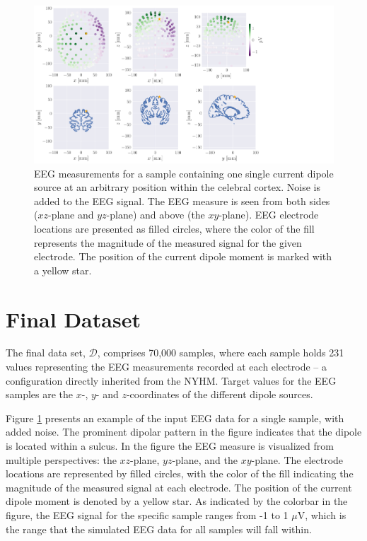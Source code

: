 \documentclass[a4paper, UKenglish, 11pt]{uiomaster}
\begin{document}
\begin{figure}[!htb]
    \centering
    \hspace*{-3cm}
    \includegraphics[width=18cm]{figures/purple_green/simple_example.pdf}
    \caption{EEG measurements for a sample containing one single current dipole source at an arbitrary position within the celebral cortex. Noise is added to the EEG signal. The EEG measure is seen from both sides ($xz$-plane and $yz$-plane) and above (the $xy$-plane). EEG electrode locations are presented as filled circles, where the color of the fill represents the magnitude of the measured signal for the given electrode. The position of the current dipole moment is marked with a yellow star.}
    \label{fig:eeg_field_1_dipole_example}
\end{figure}


\section{Final Dataset} \label{chap:final_data}
The final data set, $\mathcal{D}$, comprises 70,000 samples, where each sample holds 231 values representing the EEG measurements recorded at each electrode -- a configuration directly inherited from the NYHM. Target values for the EEG samples are the $x$-, $y$- and $z$-coordinates of the different dipole sources.

Figure \ref{fig:eeg_field_1_dipole_example} presents an example of the input EEG data for a single sample, with added noise. The prominent dipolar pattern in the figure indicates that the dipole is located within a sulcus. In the figure the EEG measure is visualized from multiple perspectives: the $xz$-plane, $yz$-plane, and the $xy$-plane. The electrode locations are represented by filled circles, with the color of the fill indicating the magnitude of the measured signal at each electrode. The position of the current dipole moment is denoted by a yellow star. As indicated by the colorbar in the figure, the EEG signal for the specific sample ranges from -1 to 1 $\mu$V, which is the range that the simulated EEG data for all samples will fall within.
\end{document}
